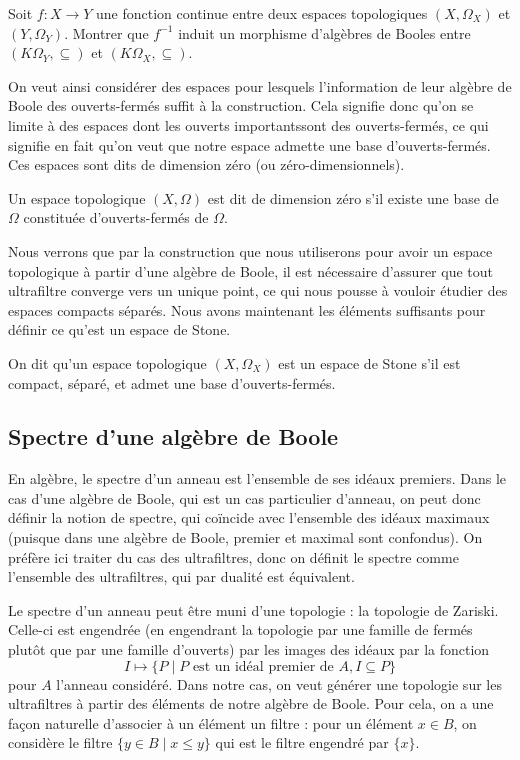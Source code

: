 \begin{exercise}
  Soit $f : X \to Y$ une fonction continue entre deux espaces topologiques
  $(X,\Omega_X)$ et $(Y,\Omega_Y)$. Montrer que $f^{-1}$ induit un morphisme
  d'algèbres de Booles entre $(K\Omega_Y,\subseteq)$ et
  $(K\Omega_X,\subseteq)$.
\end{exercise}

On veut ainsi considérer des espaces pour lesquels l'information de leur algèbre
de Boole des ouverts-fermés suffit à la construction. Cela signifie donc qu'on
se limite à des espaces dont les ouverts \og importants\fg sont des
ouverts-fermés, ce qui signifie en fait qu'on veut que notre espace admette une
base d'ouverts-fermés. Ces espaces sont dits de dimension zéro
(ou zéro-dimensionnels).

\begin{definition}
  Un espace topologique $(X,\Omega)$ est dit de dimension zéro s'il existe une
  base de $\Omega$ constituée d'ouverts-fermés de $\Omega$.
\end{definition}

Nous verrons que par la construction que nous utiliserons pour avoir un espace
topologique à partir d'une algèbre de Boole, il est nécessaire d'assurer que
tout ultrafiltre converge vers un unique point, ce qui nous pousse à vouloir
étudier des espaces compacts séparés. Nous avons maintenant les éléments
suffisants pour définir ce qu'est un espace de Stone.

\begin{definition}
  On dit qu'un espace topologique $(X,\Omega_X)$ est un espace de Stone s'il
  est compact, séparé, et admet une base d'ouverts-fermés.
\end{definition}

\subsection{Spectre d'une algèbre de Boole}

En algèbre, le spectre d'un anneau est l'ensemble de ses idéaux premiers. Dans
le cas d'une algèbre de Boole, qui est un cas particulier d'anneau, on peut donc
définir la notion de spectre, qui coïncide avec l'ensemble des idéaux maximaux
(puisque dans une algèbre de Boole, premier et maximal sont confondus). On
préfère ici traiter du cas des ultrafiltres, donc on définit le spectre comme
l'ensemble des ultrafiltres, qui par dualité est équivalent.

Le spectre d'un anneau peut être muni d'une topologie : la topologie de Zariski.
Celle-ci est engendrée (en engendrant la topologie par une famille de fermés
plutôt que par une famille d'ouverts) par les images des idéaux par la fonction
\[I \mapsto \{P\mid P\text{ est un idéal premier de } A, I\subseteq P\}\]
pour $A$ l'anneau considéré. Dans notre cas, on veut générer une topologie
sur les ultrafiltres à partir des éléments de notre algèbre de Boole. Pour cela,
on a une façon naturelle d'associer à un élément un filtre : pour un élément
$x\in B$, on considère le filtre $\{ y \in B \mid x \leq y\}$ qui est le filtre
engendré par $\{x\}$.

